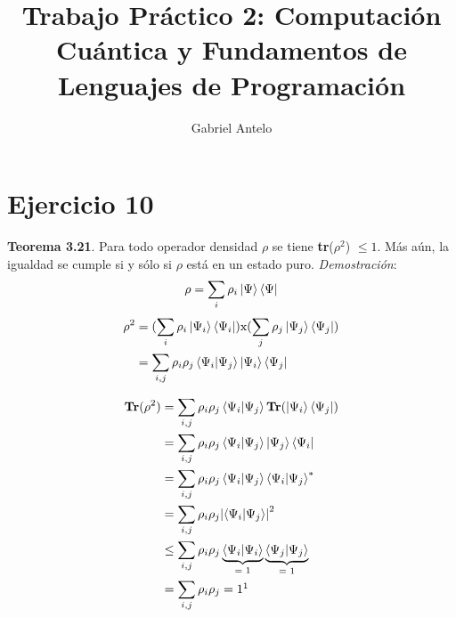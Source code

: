 \documentclass[a4paper]{article}
\title{Trabajo Práctico 2: Computación Cuántica y Fundamentos de Lenguajes de Programación}
\author{Gabriel Antelo}
\begin{document}
\maketitle

\newcommand{\seman}[1]{\llbracket #1 \rrbracket_\theta}
\newcommand{\semanmod}[2]{\llbracket #1 \rrbracket_{\theta, x = #2}}
\newcommand{\semanmodd}[3]{\llbracket #1 \rrbracket_{\theta, #2 = #3}}
\newcommand{\error}{\text{error}}
\newcommand{\N}{\mathbb N}
\newcommand{\si}{\text{ si }}
\newcommand{\letin}[4]{\text{let } #1 : #2 = #3 \text { in } #4}
\newcommand{\inter}[1]{\llbracket #1 \rrbracket}
\newcommand{\nat}{\text{nat}}
\newcommand{\Nbot}{\N\ \cup\ \{ \perp_\N \}}
\newcommand{\NtoNbot}{(\N \to \N \to N) \cup \{ \perp_{\N \to \N \to \N} \}}
\newcommand{\ifz}{\textbf {ifz$_1$}}
\newcommand{\ifzz}{\textbf {ifz$_2$}}
\newcommand{\FIX}{\text{FIX}}
\newpage
\section {Ejercicio 10}
\textbf{Teorema 3.21}. Para todo operador densidad $\rho$ se tiene \textbf{tr}($\rho^2$) $\leq 1$. 
Más aún, la igualdad se cumple si y sólo si $\rho$ está en un estado puro. \newline
\newline
\textit{Demostración}: \newline
\begin{align*}
  \rho = \sum_{i} \rho_i \ket{\Psi} \bra{\Psi}
\end{align*}
\begin{align*}
  \rho^2 &= (\sum_{i} \rho_i \ket{\Psi_i} \bra{\Psi_i}) \text{x} (\sum_{j} \rho_j \ket{\Psi_j} \bra{\Psi_j}) \\ 
              &= \sum_{i, j} \rho_i \rho_j \bra{\Psi_i}\ket{\Psi_j} \ket{\Psi_i} \bra{\Psi_j}
\end{align*}

\begin{align*}
\textbf{Tr}(\rho^2) &=  \sum_{i, j} \rho_i \rho_j \bra{\Psi_i}\ket{\Psi_j} \textbf{Tr}(\ket{\Psi_i} \bra{\Psi_j})\\
                                 &= \sum_{i, j} \rho_i \rho_j \bra{\Psi_i}\ket{\Psi_j} \ket{\Psi_j} \bra{\Psi_i}\\
                                 &= \sum_{i, j} \rho_i \rho_j \bra{\Psi_i}\ket{\Psi_j} \bra{\Psi_i} \ket{\Psi_j}^*\\
                                 &= \sum_{i, j} \rho_i \rho_j \abs{\bra{\Psi_i}\ket{\Psi_j}}^2\\
                                 &\leq \sum_{i, j} \rho_i \rho_j \underbrace{\bra{\Psi_i}\ket{\Psi_i}}_{\text{= 1}} \underbrace{\bra{\Psi_j}\ket{\Psi_j}}_{\text{= 1}}\\
                                 &= \sum_{i, j} \rho_i \rho_j = 1 \footnotemark
\end{align*}
\newpage
\end{document}
